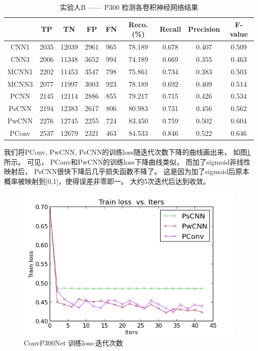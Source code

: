 \begin{table}[ht]
\centering
  \caption{实验人B —— P300 检测各卷积神经网络结果}
  \begin{tabular}{|c||c|c|c|c|c|c|c|c|}
  \hline
   & TP & TN & FP & FN & Reco.(\%) & Recall & Precision & F-value \\
  \hline\hline
   CNN1 & 2035 & 12039 & 2961 & 965 & 78.189 &  0.678 & 0.407 & 0.509\\
  \hline
   CNN3 & 2006 & 11348 & 3652 & 994 & 74.189 & 0.669 & 0.355 & 0.463\\
  \hline
   MCNN1 & 2202 &11453 & 3547 & 798 & 75.861 & 0.734 & 0.383 & 0.503 \\
 \hline
  MCNN3 & 2077 & 11997 & 3003 & 923 & 78.189 & 0.692 & 0.409 & 0.514 \\
\hline
  PCNN & 2145 & 12114 & 2886 & 855 & 79.217  & 0.715  & 0.426 & 0.534 \\
\hline
  PsCNN & 2194 &12383 & 2617 & 806 & 80.983 & 0.731 & 0.456 & 0.562 \\
\hline
  PwCNN & 2276 & 12745 & 2255 & 724 & 83.450 & 0.759 & 0.502 & 0.604 \\
\hline 
  PConv & 2537 & 12679 & 2321 & 463 & 84.533 & 0.846 & 0.522 & 0.646 \\
  \hline
  \end{tabular}
  \centering \label{tab:p300_cnn_B}
\end{table}



我们将PConv, PwCNN, PsCNN的训练loss随迭代次数下降的曲线画出来， 如图\ref{fig:train_loss}所示。 可见， PConv和PwCNN的训练loss下降曲线类似， 而加了sigmoid非线性映射后， PsCNN很快下降后几乎损失函数不降了。 这是因为加了sigmoid后原本概率被映射到[0,1]，使得误差非零即一。  大约5次迭代后达到收敛。


\begin{figure}[htb]
  \centering
  \includegraphics[scale=0.9]{Pictures/CNN/train_loss.png}
  \caption{ConvP300Net 训练loss-迭代次数}\label{fig:train_loss}
\end{figure}


